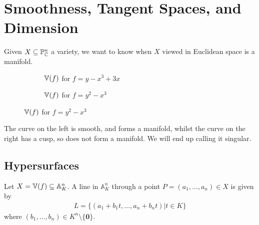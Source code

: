\documentclass[10pt,a4paper,rgb]{article}
\newcommand{\A}{\mathbb{A}}
\begin{document}
\section{Smoothness, Tangent Spaces, and Dimension}
Given $X \subseteq \mathbb{P}^n_{\mathbb{C}}$ a variety, we want to know when $X$ viewed in Euclidean space is a manifold.
\begin{figure}[H]
\begin{subfigure}{.5\textwidth}
\centering
{}
\caption{$\mathbb{V}(f)$ for $f = y-x^3+3x$}
\end{subfigure}
\begin{subfigure}{.5\textwidth}
\centering
{}
\caption{$\mathbb{V}(f)$ for $f = y^2-x^3$}
\end{subfigure}
\end{figure}
The curve on the left is smooth, and forms a manifold, whilst the curve on the right has a cusp, so does not form a manifold. We will end up calling it singular.
\subsection{Hypersurfaces}
Let $X = \V(f) \subseteq \A^n_K$. A line in $\A^n_K$ through a point $P = (a_1, \ldots, a_n) \in X$ is given by
\begin{align*}
L = \{ (a_1+b_1t, \ldots, a_n+b_nt)| t \in K\}
\end{align*}
where $(b_1, \ldots, b_n) \in K^n \setminus \{\mathbf{0}\}$. 
\end{document}
